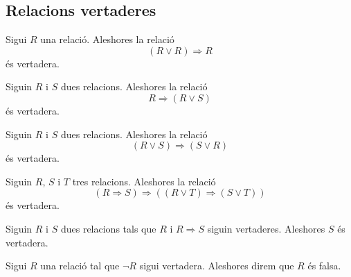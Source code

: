 \documentclass[../Apunts.tex]{subfiles}
\begin{document}
	\subsection{Relacions vertaderes}
	\begin{axiom}
		\label{axiom:relacions 1}
		Sigui \(R\) una relació. Aleshores la relació
		\[(R\lor R)\Rightarrow R\]
		és vertadera.
	\end{axiom}
	\begin{axiom}
		\label{axiom:relacions 2}
		Siguin \(R\) i \(S\) dues relacions. Aleshores la relació
		\[R\Rightarrow(R\lor S)\]
		és vertadera.
	\end{axiom}
	\begin{axiom}
		\label{axiom:relacions 3}
		Siguin \(R\) i \(S\) dues relacions. Aleshores la relació
		\[(R\lor S)\Rightarrow(S\lor R)\]
		és vertadera.
	\end{axiom}
	\begin{axiom}
		\label{axiom:relacions 4}
		Siguin \(R\), \(S\) i \(T\) tres relacions. Aleshores la relació
		\[(R\Rightarrow S)\Rightarrow((R\lor T)\Rightarrow(S\lor T))\]
		és vertadera.
	\end{axiom}
	\begin{axiom}
		\label{axiom:relacions 5}
		Siguin \(R\) i \(S\) dues relacions tals que \(R\) i \(R\Rightarrow S\) siguin vertaderes. Aleshores \(S\) és vertadera.
	\end{axiom}
	\begin{definition}
		Sigui \(R\) una relació tal que \(\lnot R\) sigui vertadera. Aleshores direm que \(R\) és falsa.
	\end{definition}
\end{document}
